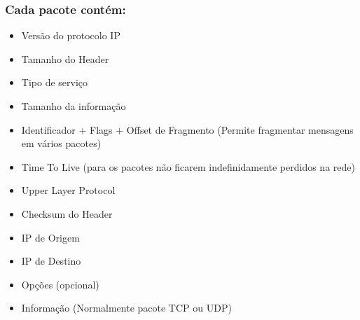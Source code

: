 \documentclass[../resumosRCOM.tex]{subfiles}
\begin{document}
\subsubsection{Cada pacote contém:}
\begin{itemize}
    \item Versão do protocolo IP
	\item Tamanho do Header
	\item Tipo de serviço
	\item Tamanho da informação
	\item Identificador + Flags + Offset de Fragmento (Permite fragmentar mensagens em vários pacotes)
	\item Time To Live (para os pacotes não ficarem indefinidamente perdidos na rede)
	\item Upper Layer Protocol
	\item Checksum do Header
	\item IP de Origem
	\item IP de Destino
	\item Opções (opcional)
	\item Informação (Normalmente pacote TCP ou UDP)
\end{itemize}
\end{document}
